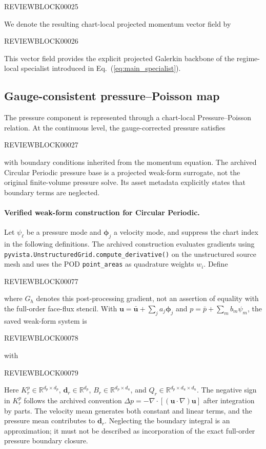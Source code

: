 \documentclass{article}
\def\plaineqref#1{\ref{#1}}
\begin{document}
REVIEWBLOCK00025



We denote the resulting chart-local projected momentum vector field by


REVIEWBLOCK00026


This vector field provides the explicit projected Galerkin backbone of the
regime-local specialist introduced in
Eq.~(\plaineqref{eq:main_specialist}).


\subsection{Gauge-consistent pressure--Poisson map}

The pressure component is represented through a chart-local
Pressure--Poisson relation.
At the continuous level, the gauge-corrected pressure satisfies


REVIEWBLOCK00027


with boundary conditions inherited from the momentum equation. The archived Circular Periodic pressure base is a projected weak-form surrogate, not the original finite-volume pressure solve. Its asset metadata explicitly states that boundary terms are neglected.

\paragraph{Verified weak-form construction for Circular Periodic.}
Let $\psi_\ell$ be a pressure mode and $\bm\phi_j$ a velocity mode, and suppress the chart index in the following definitions. The archived construction evaluates gradients using \texttt{pyvista.UnstructuredGrid.compute\_derivative()} on the unstructured source mesh and uses the POD \texttt{point\_areas} as quadrature weights $w_i$. Define


REVIEWBLOCK00077


where $G_h$ denotes this post-processing gradient, not an assertion of equality with the full-order face-flux stencil. With $\bm u=\bar{\bm u}+\sum_j a_j\bm\phi_j$ and $p=\bar p+\sum_m b_m\psi_m$, the saved weak-form system is


REVIEWBLOCK00078


with


REVIEWBLOCK00079


Here $K_r^p\in\mathbb R^{d_p\times d_p}$, $\bm d_r\in\mathbb R^{d_p}$, $B_r\in\mathbb R^{d_p\times d_u}$, and $Q_r\in\mathbb R^{d_p\times d_u\times d_u}$. The negative sign in $K_r^p$ follows the archived convention $\Delta p=-\nabla\cdot[(\bm u\cdot\nabla)\bm u]$ after integration by parts. The velocity mean generates both constant and linear terms, and the pressure mean contributes to $\bm d_r$. Neglecting the boundary integral is an approximation; it must not be described as incorporation of the exact full-order pressure boundary closure.
\end{document}
